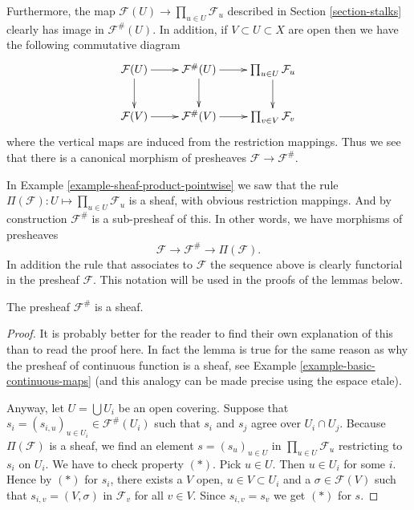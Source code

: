 \medskip\noindent
Furthermore, the map $\mathcal{F}(U) \to \prod_{u \in U} \mathcal{F}_u$
described in Section \ref{section-stalks} clearly has image
in $\mathcal{F}^{\#}(U)$. In addition, if $V \subset U \subset X$ are
open then we have the following commutative diagram
$$
\xymatrix{
\mathcal{F}(U) \ar[r] \ar[d] &
\mathcal{F}^{\#}(U) \ar[r] \ar[d] &
\prod_{u\in U} \mathcal{F}_u \ar[d]\cr
\mathcal{F}(V) \ar[r] &
\mathcal{F}^{\#}(V) \ar[r] &
\prod_{v\in V} \mathcal{F}_v
}
$$
where the vertical maps are induced from the
restriction mappings. Thus we see that
there is a canonical morphism of presheaves
$\mathcal{F} \to \mathcal{F}^{\#}$.

\medskip\noindent
In Example \ref{example-sheaf-product-pointwise} we saw
that the rule $\Pi(\mathcal{F}) : U \mapsto \prod_{u\in U} \mathcal{F}_u$
is a sheaf, with obvious restriction mappings. And by construction
$\mathcal{F}^{\#}$ is a sub-presheaf of this. In other words, we
have morphisms of presheaves
$$
\mathcal{F} \to \mathcal{F}^\# \to \Pi(\mathcal{F}).
$$
In addition the rule that associates to $\mathcal{F}$
the sequence above is clearly functorial in the presheaf $\mathcal{F}$.
This notation will be
used in the proofs of the lemmas below.

\begin{lemma}
\label{lemma-sheafification-sheaf}
The presheaf $\mathcal{F}^{\#}$ is a sheaf.
\end{lemma}

\begin{proof}
It is probably better for the reader to find their own explanation
of this than to read the proof here. In fact the lemma is true
for the same reason as why the presheaf of continuous
function is a sheaf, see Example \ref{example-basic-continuous-maps}
(and this analogy can be made precise using the espace etale).

\medskip\noindent
Anyway, let $U = \bigcup U_i$ be an open covering.
Suppose that $s_i = (s_{i,u})_{u \in U_i} \in \mathcal{F}^{\#}(U_i)$
such that $s_i$ and $s_j$ agree over $U_i \cap U_j$.
Because $\Pi(\mathcal{F})$ is a sheaf,
we find an element $s = (s_u)_{u\in U}$ in $\prod_{u\in U} \mathcal{F}_u$
restricting to $s_i$ on $U_i$. We have to check property $(*)$.
Pick $u \in U$. Then $u \in U_i$ for some $i$. Hence by $(*)$ for $s_i$,
there exists a $V$ open, $u \in V \subset U_i$
and a $\sigma \in \mathcal{F}(V)$
such that $s_{i, v} = (V, \sigma)$ in $\mathcal{F}_v$ 
for all $v \in V$. Since $s_{i,v} = s_v$ we get $(*)$ for $s$.
\end{proof}


